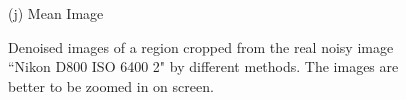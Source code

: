 \documentclass[10pt,onecolumn,letterpaper]{article}
\begin{document}
\begin{figure}
{\begin{minipage}[t]{0.195\textwidth}
{\footnotesize (j) Mean Image \cite{crosschannel2016}}
\end{minipage}
}
\caption{Denoised images of a region cropped from the real noisy image ``Nikon D800 ISO 6400 2" \cite{crosschannel2016} by different methods. The images are better to be zoomed in on screen.}
\label{fig5}
\end{figure}





{
\small


}
\end{document}
